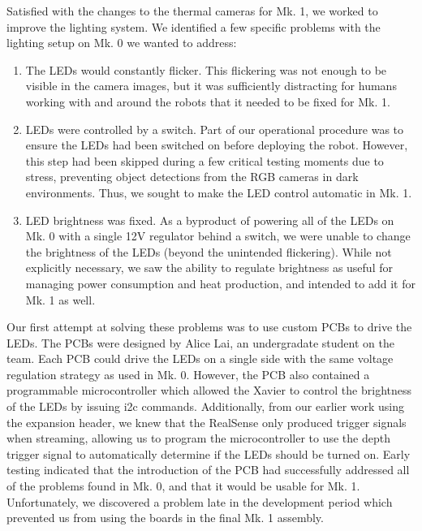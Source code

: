 Satisfied with the changes to the thermal cameras for Mk. 1, we worked to improve the lighting system. We identified a few specific problems with the lighting setup on Mk. 0 we wanted to address:

\begin{enumerate}
	\item The LEDs would constantly flicker. This flickering was not enough to be visible in the camera images, but it was sufficiently distracting for humans working with and around the robots that it needed to be fixed for Mk. 1.
	\item LEDs were controlled by a switch. Part of our operational procedure was to ensure the LEDs had been switched on before deploying the robot. However, this step had been skipped during a few critical testing moments due to stress, preventing object detections from the RGB cameras in dark environments. Thus, we sought to make the LED control automatic in Mk. 1.
	\item LED brightness was fixed. As a byproduct of powering all of the LEDs on Mk. 0 with a single 12V regulator behind a switch, we were unable to change the brightness of the LEDs (beyond the unintended flickering). While not explicitly necessary, we saw the ability to regulate brightness as useful for managing power consumption and heat production, and intended to add it for Mk. 1 as well.
\end{enumerate}

Our first attempt at solving these problems was to use custom PCBs to drive the LEDs. The PCBs were designed by Alice Lai, an undergradate student on the team. Each PCB could drive the LEDs on a single side with the same voltage regulation strategy as used in Mk. 0. However, the PCB also contained a programmable microcontroller which allowed the Xavier to control the brightness of the LEDs by issuing i2c commands. Additionally, from our earlier work using the expansion header, we knew that the RealSense only produced trigger signals when streaming, allowing us to program the microcontroller to use the depth trigger signal to automatically determine if the LEDs should be turned on. Early testing indicated that the introduction of the PCB had successfully addressed all of the problems found in Mk. 0, and that it would be usable for Mk. 1. Unfortunately, we discovered a problem late in the development period which prevented us from using the boards in the final Mk. 1 assembly.

